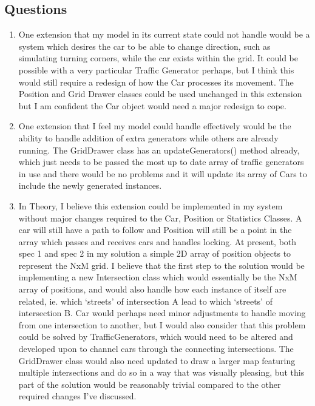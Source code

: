 \documentclass[11pt, oneside]{article}
\begin{document}
\subsection*{Questions}
\begin{enumerate}
\item{One extension that my model in its current state could not handle would be a system which desires the car to be able to change direction, such as simulating turning corners, while the car exists within the grid. It could be possible with a very particular Traffic Generator perhaps, but I think this would still require a redesign of how the Car processes its movement. The Position and Grid Drawer classes could be used unchanged in this extension but I am confident the Car object would need a major redesign to cope.}
\item{One extension that I feel my model could handle effectively would be the ability to handle addition of extra generators while others are already running. The GridDrawer class has an updateGenerators() method already, which just needs to be passed the most up to date array of traffic generators in use and there would be no problems and it will update its array of Cars to include the newly generated instances.}
\item{In Theory, I believe this extension could be implemented in my system without major changes required to the Car, Position or Statistics Classes. A car will still have a path to follow and Position will still be a point in the array which passes and receives cars and handles locking. At present, both spec 1 and spec 2 in my solution a simple 2D array of position objects to represent the NxM grid. I believe that the first step to the solution would be implementing a new Intersection class which would essentially be the NxM array of positions, and would also handle how each instance of itself are related, ie. which `streets' of intersection A lead to which `streets' of intersection B. Car would perhaps need minor adjustments to handle moving from one intersection to another, but I would also consider that this problem could be solved by TrafficGenerators, which would need to be altered and developed upon to channel cars through the connecting intersections. The GridDrawer class would also need updated to draw a larger map featuring multiple intersections and do so in a way that was visually pleasing, but this part of the solution would be reasonably trivial compared to the other required changes I've discussed.

}
\end{enumerate}
\end{document}
